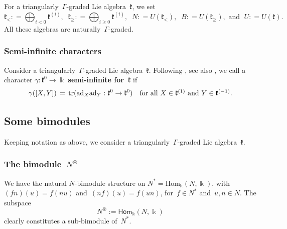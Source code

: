 \documentclass[11pt]{amsart}
\newcommand{\fHom}{{\mathsf{Hom}}}
\newcommand{\fnul}{{0}}
\newcommand{\tr}{{\rm{tr}}}
\newcommand{\ad}{\mathrm{ad}}
\newcommand{\Hom}{\mathrm{Hom}}
\newcommand{\mk}{\Bbbk}
\newcommand{\fk}{\mathfrak{k}}
\newcommand{\mZ}{\mathbb{Z}}
\numberwithin{equation}{section}
\theoremstyle{plain}
\theoremstyle{remark}
\newtheorem{rem}[subsubsection]{Remark}
\theoremstyle{remark}
\newtheorem{ex}[subsubsection]{Example}
\theoremstyle{construction}
\begin{document}


\subsubsection{}\label{defBN} For a triangularly~$\Gamma$-graded Lie algebra~$\fk$, we set
$$\fk_{<}{:}=\bigoplus_{i<0}\fk^{(i)},\;\;\fk_{\ge}{:}=\bigoplus_{i\ge 0}\fk^{(i)},\;\; N{:}=U(\fk_{<}),\;\; B{:}=U(\fk_{\ge}),\mbox{ and }\; U{:}=U(\fk).$$
All these algebras are naturally~$\Gamma$-graded.
\subsubsection{Semi-infinite characters}\label{DefSemi} Consider a triangularly~$\Gamma$-graded Lie algebra~$\fk$.
Following \cite[Definition~1.1]{Soergel}, see also \cite{Arkhipov}, we call a character $\gamma:\fk^{\fnul}\to\mk$ {\bf semi-infinite for~$\fk$} if
$$\gamma([X,Y])\,=\,\tr(\ad_X\ad_Y:\fk^{\fnul}\to\fk^{\fnul})\quad \mbox{for all $X\in\fk^{(1)}$ and~$Y\in\fk^{(-1)}$}.$$


\subsection{Some bimodules}
Keeping notation as above, we consider a triangularly~$\Gamma$-graded Lie algebra~$\fk$.

\subsubsection{The bimodule~$N^{\circledast}$}\label{Nast}We have the natural $N$-bimodule structure on $N^\ast=\Hom_{\mk}(N,\mk)$, with $(fn)(u)=f(nu)$ and~$(nf)(u)=f(un)$, for~$f\in N^\ast$ and~$u,n\in N$.
The subspace
$$N^{\circledast}:=\fHom_{\mk}(N,\mk)$$
clearly constitutes a sub-bimodule of~$N^\ast$.
\end{document}
